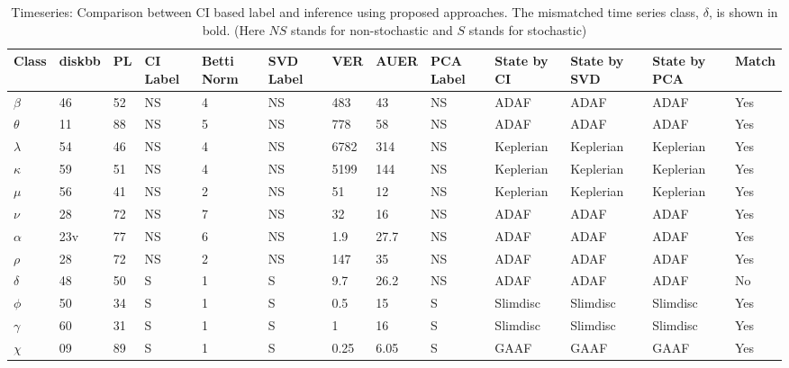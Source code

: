 \documentclass[journal]{IEEEtran}
\begin{document}
	
	
	\begin{table}[t]
		\caption{Timeseries: Comparison between CI based label and inference using proposed approaches. The mismatched time series class, $\delta$, is shown in bold. (Here $NS$ stands for non-stochastic and $S$ stands for stochastic)}
		\begin{center}
			\begin{tabular}{|p{0.5cm}|p{0.5cm}|p{0.5cm}|p{0.75cm}|p{0.75cm}|p{0.75cm}|p{0.75cm}|p{1cm}|p{0.5cm}|p{1.25cm}|p{1.25cm}|p{1.25cm}|p{0.75cm}|}
				\hline
				Class &  diskbb & PL & CI \newline Label & Betti Norm & SVD \newline Label & VER & AUER & PCA \newline Label  &  State by CI & State by SVD  & State by PCA  &Match \\
				\hline
				$\beta$ & 46 & 52 & NS & 4 & NS & 483 & 43 & NS & ADAF & ADAF & ADAF & Yes\\
			\hline
				$\theta$ & 11 & 88 & NS &  5 & NS & 778 & 58 & NS  &  ADAF & ADAF & ADAF & Yes \\
				\hline
			$\lambda$ & 54& 46 & NS & 4 & NS & 6782 & 314 & NS & Keplerian & Keplerian & Keplerian & Yes \\
			\hline
				$\kappa$ &59 & 51& NS & 4 & NS & 5199 & 144 & NS & Keplerian & Keplerian & Keplerian &Yes \\
			\hline
		$\mu$ & 56 & 41& NS & 2 & NS & 51 & 12 & NS & Keplerian & Keplerian & Keplerian &Yes \\
		\hline
			$\nu$ &28 &72& NS & 7 & NS & 32 & 16 & NS & ADAF & ADAF & ADAF & Yes \\
			\hline
$\alpha$  & 23v& 77 & NS & 6 & NS & 1.9 & 27.7 & NS & ADAF & ADAF & ADAF &Yes \\
\hline
$\rho$ & 28& 72& NS & 2 & NS & 147 & 35 & NS & ADAF & ADAF & ADAF & Yes \\
\hline
$\delta$ &48 & 50& S & 1 & S & 9.7 & 26.2 & NS & ADAF & ADAF & ADAF & No \\
\hline
$\phi$ & 50 &34&S & 1 & S & 0.5 & 15 & S & Slimdisc & Slimdisc & Slimdisc &Yes \\
\hline
$\gamma$ & 60&31 & S & 1 & S & 1 & 16 & S & Slimdisc & Slimdisc & Slimdisc &Yes \\
\hline
$\chi$ & 09& 89 & S & 1 & S & 0.25 & 6.05 & S & GAAF & GAAF & GAAF &Yes \\
\hline
			\end{tabular}
			\label{tab:results_1}
		\end{center}
	\end{table}
\end{document}
